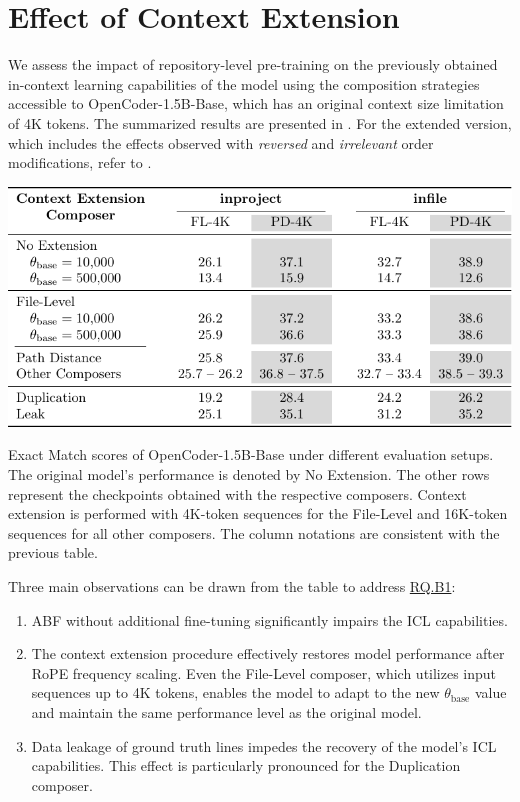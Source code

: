 \section{Effect of Context Extension}\label{sec:effect-of-context-extension}

We assess the impact of repository-level pre-training on the previously obtained in-context learning capabilities of the model using the composition strategies accessible to OpenCoder-1.5B-Base, which has an original context size limitation of 4K tokens. The summarized results are presented in . For the extended version, which includes the effects observed with \textit{reversed} and \textit{irrelevant} order modifications, refer to .

\begin{table}[htbp]
    \centering
    \includegraphics[width=\textwidth]{tables/rq-b1.pdf}
    \caption{Exact Match scores of OpenCoder-1.5B-Base under different evaluation setups. The original model's performance is denoted by No Extension. The other rows represent the checkpoints obtained with the respective composers. Context extension is performed with 4K-token sequences for the File-Level and 16K-token sequences for all other composers. The column notations are consistent with the previous table.}\label{tab:ocoder-in-context-retention}
\end{table}

Three main observations can be drawn from the table to address \hyperref[rq:rq-b1]{RQ.B1}:

\begin{enumerate}
\item ABF without additional fine-tuning significantly impairs the ICL capabilities.
\item The context extension procedure effectively restores model performance after RoPE frequency scaling. Even the File-Level composer, which utilizes input sequences up to 4K tokens, enables the model to adapt to the new \(\theta_{\mathrm{base}}\) value and maintain the same performance level as the original model.
\item Data leakage of ground truth lines impedes the recovery of the model's ICL capabilities. This effect is particularly pronounced for the Duplication composer.
\end{enumerate}

